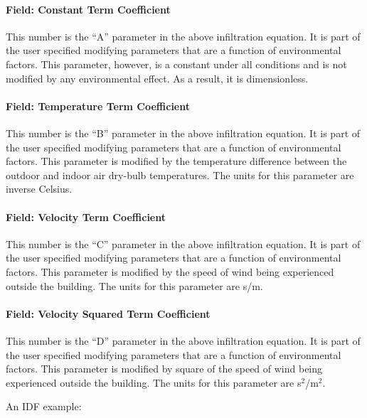 \paragraph{Field: Constant Term Coefficient}\label{field-constant-term-coefficient}

This number is the ``A'' parameter in the above infiltration equation. It is part of the user specified modifying parameters that are a function of environmental factors. This parameter, however, is a constant under all conditions and is not modified by any environmental effect. As a result, it is dimensionless.

\paragraph{Field: Temperature Term Coefficient}\label{field-temperature-term-coefficient}

This number is the ``B'' parameter in the above infiltration equation. It is part of the user specified modifying parameters that are a function of environmental factors. This parameter is modified by the temperature difference between the outdoor and indoor air dry-bulb temperatures. The units for this parameter are inverse Celsius.

\paragraph{Field: Velocity Term Coefficient}\label{field-velocity-term-coefficient}

This number is the ``C'' parameter in the above infiltration equation. It is part of the user specified modifying parameters that are a function of environmental factors. This parameter is modified by the speed of wind being experienced outside the building. The units for this parameter are s/m.

\paragraph{Field: Velocity Squared Term Coefficient}\label{field-velocity-squared-term-coefficient}

This number is the ``D'' parameter in the above infiltration equation. It is part of the user specified modifying parameters that are a function of environmental factors. This parameter is modified by square of the speed of wind being experienced outside the building. The units for this parameter are s\(^{2}\)/m\(^{2}\).

An IDF example:

